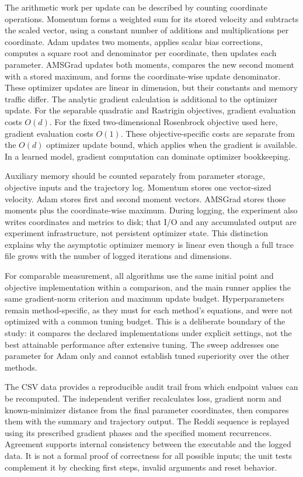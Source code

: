 ﻿\documentclass[conference]{IEEEtran}
\begin{document}
The arithmetic work per update can be described by counting coordinate operations. Momentum forms a weighted sum for its stored velocity and subtracts the scaled vector, using a constant number of additions and multiplications per coordinate. Adam updates two moments, applies scalar bias corrections, computes a square root and denominator per coordinate, then updates each parameter. AMSGrad updates both moments, compares the new second moment with a stored maximum, and forms the coordinate-wise update denominator. These optimizer updates are linear in dimension, but their constants and memory traffic differ. The analytic gradient calculation is additional to the optimizer update. For the separable quadratic and Rastrigin objectives, gradient evaluation costs $O(d)$. For the fixed two-dimensional Rosenbrock objective used here, gradient evaluation costs $O(1)$. These objective-specific costs are separate from the $O(d)$ optimizer update bound, which applies when the gradient is available. In a learned model, gradient computation can dominate optimizer bookkeeping.

Auxiliary memory should be counted separately from parameter storage, objective inputs and the trajectory log. Momentum stores one vector-sized velocity. Adam stores first and second moment vectors. AMSGrad stores those moments plus the coordinate-wise maximum. During logging, the experiment also writes coordinates and metrics to disk; that I/O and any accumulated output are experiment infrastructure, not persistent optimizer state. This distinction explains why the asymptotic optimizer memory is linear even though a full trace file grows with the number of logged iterations and dimensions.

For comparable measurement, all algorithms use the same initial point and objective implementation within a comparison, and the main runner applies the same gradient-norm criterion and maximum update budget. Hyperparameters remain method-specific, as they must for each method's equations, and were not optimized with a common tuning budget. This is a deliberate boundary of the study: it compares the declared implementations under explicit settings, not the best attainable performance after extensive tuning. The sweep addresses one parameter for Adam only and cannot establish tuned superiority over the other methods.

The CSV data provides a reproducible audit trail from which endpoint values can be recomputed. The independent verifier recalculates loss, gradient norm and known-minimizer distance from the final parameter coordinates, then compares them with the summary and trajectory output. The Reddi sequence is replayed using its prescribed gradient phases and the specified moment recurrences. Agreement supports internal consistency between the executable and the logged data. It is not a formal proof of correctness for all possible inputs; the unit tests complement it by checking first steps, invalid arguments and reset behavior.
\end{document}
